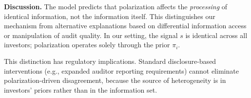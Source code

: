 \textbf{Discussion.} The model predicts that polarization affects the
\emph{processing} of identical information, not the information itself.
This distinguishes our mechanism from alternative explanations based on
differential information access or manipulation of audit quality. In our
setting, the signal $s$ is identical across all investors; polarization
operates solely through the prior $\pi_i$.

This distinction has regulatory implications. Standard disclosure-based
interventions (e.g., expanded auditor reporting requirements) cannot
eliminate polarization-driven disagreement, because the source of
heterogeneity is in investors' priors rather than in the information set.
